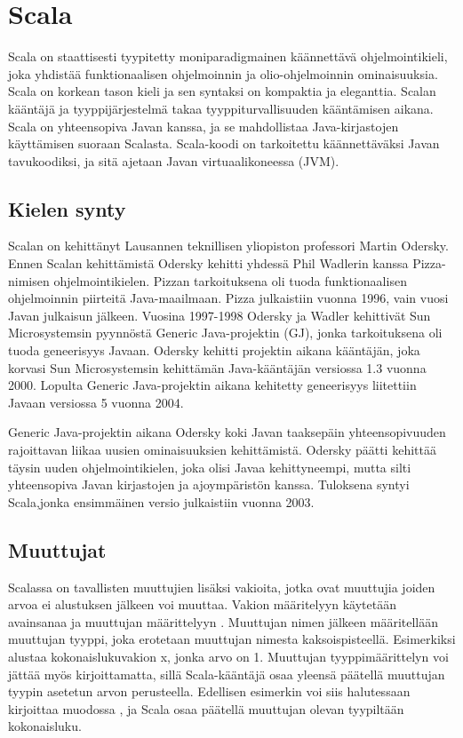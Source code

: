 \chapter{Scala} \label{Scala}

Scala on staattisesti tyypitetty moniparadigmainen käännettävä ohjelmointikieli, joka yhdistää funktionaalisen ohjelmoinnin ja olio-ohjelmoinnin ominaisuuksia. Scala on korkean tason kieli ja sen syntaksi on kompaktia ja eleganttia. Scalan kääntäjä ja tyyppijärjestelmä takaa tyyppiturvallisuuden kääntämisen aikana. Scala on yhteensopiva Javan kanssa, ja se mahdollistaa Java-kirjastojen käyttämisen suoraan Scalasta. Scala-koodi on tarkoitettu käännettäväksi Javan tavukoodiksi, ja sitä ajetaan Javan virtuaalikoneessa (JVM).
\cite[Introduction]{tourOfScala}
\cite[Luku 2]{prorgrammingInScala3rd}


\section{Kielen synty} \label{Kielen synty}
Scalan on kehittänyt Lausannen teknillisen yliopiston professori Martin Odersky. Ennen Scalan kehittämistä Odersky kehitti yhdessä Phil Wadlerin kanssa Pizza-nimisen ohjelmointikielen. Pizzan tarkoituksena oli tuoda funktionaalisen ohjelmoinnin piirteitä Java-maailmaan. Pizza julkaistiin vuonna 1996, vain vuosi Javan julkaisun jälkeen. Vuosina 1997-1998 Odersky ja Wadler kehittivät Sun Microsystemsin pyynnöstä Generic Java-projektin (GJ), jonka tarkoituksena oli tuoda geneerisyys Javaan. Odersky kehitti projektin aikana kääntäjän, joka korvasi Sun Microsystemsin kehittämän Java-kääntäjän versiossa 1.3 vuonna 2000. Lopulta Generic Java-projektin aikana kehitetty geneerisyys liitettiin Javaan versiossa 5 vuonna 2004.
\cite{originsOfScala}

Generic Java-projektin aikana Odersky koki Javan taaksepäin yhteensopivuuden rajoittavan liikaa uusien ominaisuuksien kehittämistä. Odersky päätti kehittää täysin uuden ohjelmointikielen, joka olisi Javaa kehittyneempi, mutta silti yhteensopiva Javan kirjastojen ja ajoympäristön kanssa. Tuloksena syntyi Scala,jonka ensimmäinen versio julkaistiin vuonna 2003.
\cite{originsOfScala}


\section{Muuttujat} \label{Muuttujat}
Scalassa on tavallisten muuttujien lisäksi vakioita, jotka ovat muuttujia joiden arvoa ei alustuksen jälkeen voi muuttaa. Vakion määritelyyn käytetään avainsanaa  ja muuttujan määrittelyyn . Muuttujan nimen jälkeen määritellään muuttujan tyyppi, joka erotetaan muuttujan nimesta kaksoispisteellä. Esimerkiksi  alustaa kokonaislukuvakion x, jonka arvo on 1. Muuttujan tyyppimäärittelyn voi jättää myös kirjoittamatta, sillä Scala-kääntäjä osaa yleensä päätellä muuttujan tyypin asetetun arvon perusteella. Edellisen esimerkin voi siis halutessaan kirjoittaa muodossa , ja Scala osaa päätellä muuttujan olevan tyypiltään kokonaisluku.
\cite[Basics]{tourOfScala}

